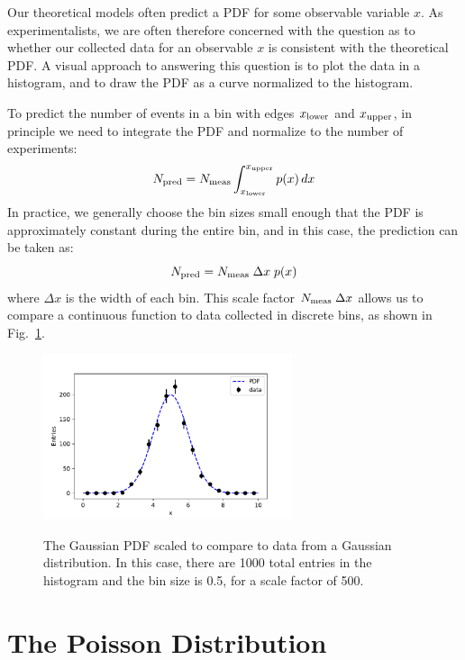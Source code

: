 \documentclass[12pt,oneside]{book}
\begin{document}
Our theoretical models often predict a PDF for some observable variable $x$.  As experimentalists, we are often therefore concerned with the question as to whether our collected data for an observable $x$ is consistent with the theoretical PDF.  A visual approach to answering this question is to plot the data in a histogram, and to draw the PDF as a curve normalized to the histogram.

To predict the number of events in a bin with edges $x_{\rm lower}$ and $x_{\rm upper}$, in principle we need to integrate the PDF and normalize to the number of experiments:
\begin{displaymath}
N_{\rm pred} = N_{\rm meas} \int^{x_{\rm upper}}_{x_{\rm lower}} p(x) \, dx
\end{displaymath}
In practice, we generally choose the bin sizes small enough that the PDF is approximately constant during the entire bin, and in this case, the prediction can be taken as:
\begin{displaymath}
N_{\rm pred} = N_{\rm meas} \; \Delta x \; p(x)
\end{displaymath}
where $\Delta x$ is the width of each bin.  This scale factor $N_{\rm meas} \; \Delta x$ allows us to compare a continuous function to data collected in discrete bins, as shown in Fig.~\ref{fig:histpdf}.

\begin{figure}[htbp]
\begin{center}
{\includegraphics[width=0.65\textwidth]{figs/compare.pdf}}
\end{center}
\caption{\label{fig:histpdf} The Gaussian PDF scaled to compare to data from a Gaussian distribution.
In this case, there are 1000 total entries in the histogram and the bin size is 0.5, for a scale factor of 500.
}
\end{figure}

\section{The Poisson Distribution}
\end{document}
